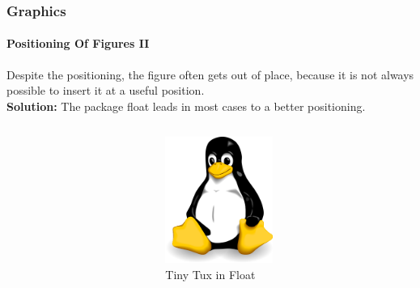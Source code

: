 
\begin{frame}[t]
\medskip
\frametitle{Graphics}
\framesubtitle{Positioning Of Figures II}
Despite the positioning, the figure often gets out of place, because it is not always possible to insert it at a useful position.\\
\textbf{Solution:} The package {\ttfamily float} leads in most cases to a better positioning.

\begin{columns}
\begin{column}{.5\textwidth}
{\ttfamily {\footnotesize
}}
\end{column}

\begin{column}{.5\textwidth} 
\begin{figure}
\begin{center}
    \includegraphics[width=35mm]{image/tux.png}
\caption{Tiny Tux in Float}
\label{img:kleinertux_float}
\end{center}
\end{figure}
\end{column}
\end{columns}

\end{frame}
